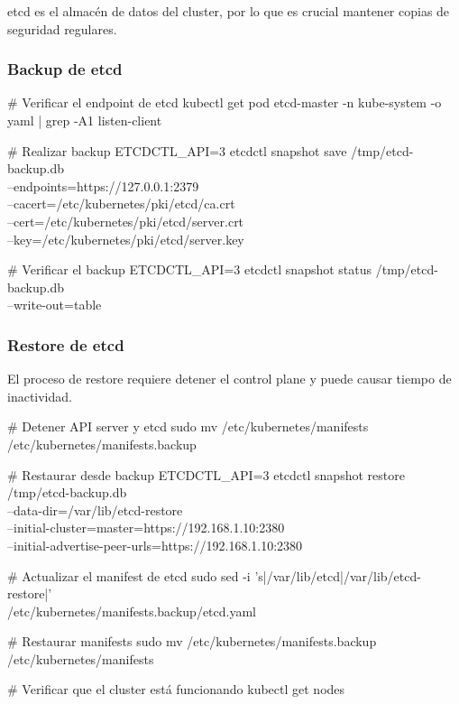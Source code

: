\documentclass[11pt,a4paper]{article}
\begin{document}
etcd es el almacén de datos del cluster, por lo que es crucial mantener copias de seguridad regulares.

\subsubsection{Backup de etcd}

\begin{commandbox}
\# Verificar el endpoint de etcd
kubectl get pod etcd-master -n kube-system -o yaml | grep -A1 listen-client

\# Realizar backup
ETCDCTL\_API=3 etcdctl snapshot save /tmp/etcd-backup.db \\
  --endpoints=https://127.0.0.1:2379 \\
  --cacert=/etc/kubernetes/pki/etcd/ca.crt \\
  --cert=/etc/kubernetes/pki/etcd/server.crt \\
  --key=/etc/kubernetes/pki/etcd/server.key

\# Verificar el backup
ETCDCTL\_API=3 etcdctl snapshot status /tmp/etcd-backup.db \\
  --write-out=table
\end{commandbox}

\subsubsection{Restore de etcd}

\begin{errorbox}
El proceso de restore requiere detener el control plane y puede causar tiempo de inactividad.
\end{errorbox}

\begin{commandbox}
\# Detener API server y etcd
sudo mv /etc/kubernetes/manifests /etc/kubernetes/manifests.backup

\# Restaurar desde backup
ETCDCTL\_API=3 etcdctl snapshot restore /tmp/etcd-backup.db \\
  --data-dir=/var/lib/etcd-restore \\
  --initial-cluster=master=https://192.168.1.10:2380 \\
  --initial-advertise-peer-urls=https://192.168.1.10:2380

\# Actualizar el manifest de etcd
sudo sed -i 's|/var/lib/etcd|/var/lib/etcd-restore|' \\
  /etc/kubernetes/manifests.backup/etcd.yaml

\# Restaurar manifests
sudo mv /etc/kubernetes/manifests.backup /etc/kubernetes/manifests

\# Verificar que el cluster está funcionando
kubectl get nodes
\end{commandbox}
\end{document}
